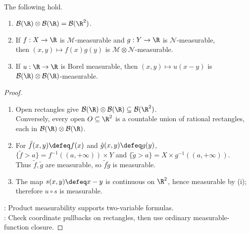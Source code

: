 \begin{proposition} \label{prop:product-borel-and-measurable-building-blocks} \\
The following hold.
\begin{enumerate}[label=(\roman*)]
\setlength{\itemsep}{0pt}
\item $\mathcal{B}(\R)\otimes\mathcal{B}(\R)=\mathcal{B}(\R^2)$.
\item If $f:X\to\R$ is $\mathcal{M}$-measurable and $g:Y\to\R$ is $\mathcal{N}$-measurable,\\
then $(x,y)\mapsto f(x)g(y)$ is $\mathcal{M}\otimes\mathcal{N}$-measurable.
\item If $u:\R\to\R$ is Borel measurable, then $(x,y)\mapsto u(x-y)$ is $\mathcal{B}(\R)\otimes\mathcal{B}(\R)$-measurable.
\end{enumerate}
\begin{proof}
\begin{enumerate}[label=(\roman*)]
\setlength{\itemsep}{0pt}
\item Open rectangles give $\mathcal{B}(\R)\otimes\mathcal{B}(\R)\subseteq\mathcal{B}(\R^2)$.\\
Conversely, every open $O\subseteq\R^2$ is a countable union of rational rectangles, each in $\mathcal{B}(\R)\otimes\mathcal{B}(\R)$.
\item For $\tilde f(x,y)\defeq f(x)$ and $\tilde g(x,y)\defeq g(y)$, $\{\tilde f>a\}=f^{-1}((a,+\infty))\times Y$ and $\{\tilde g>a\}=X\times g^{-1}((a,+\infty))$.\\
Thus $\tilde f,\tilde g$ are measurable, so $\tilde f\tilde g$ is measurable.
\item The map $s(x,y)\defeq x-y$ is continuous on $\R^2$, hence measurable by (i); therefore $u\circ s$ is measurable.
\end{enumerate}
: Product measurability supports two-variable formulas.\\
: Check coordinate pullbacks on rectangles, then use ordinary measurable-function closure.
\end{proof}
\end{proposition}

